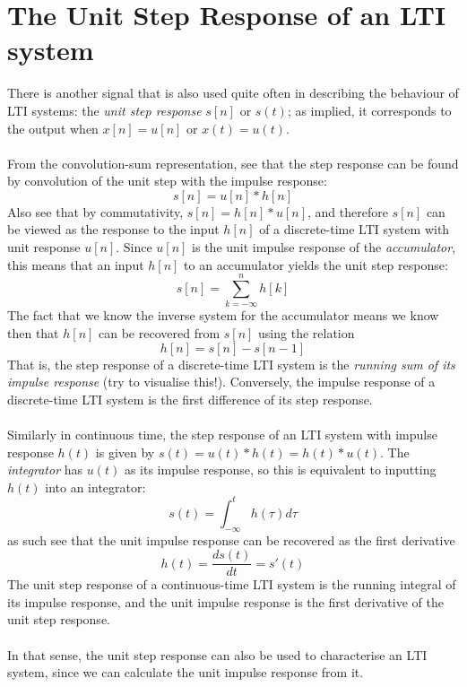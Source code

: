 \documentclass{report}
\begin{document}
\section{The Unit Step Response of an LTI system}
There is another signal that is also used quite often in describing the behaviour of LTI systems: the \textit{unit step response} $s[n]$
or $s(t)$; as implied, it corresponds to the output when $x[n]=u[n]$ or $x(t)=u(t)$.\\
\vspace{1mm}\\
 From the convolution-sum representation, see that
the step response can be found by convolution of the unit step with the impulse response:
\begin{equation*}
s[n]=u[n]*h[n]
\end{equation*}
Also see that by commutativity, $s[n]=h[n]*u[n]$, and therefore $s[n]$ can be viewed as the response to the input $h[n]$ of a 
discrete-time LTI system with unit response $u[n]$. Since $u[n]$ is the unit impulse response of the \textit{accumulator},
this means that an input $h[n]$ to an accumulator yields the unit step response:
\begin{equation*}
s[n]=\sum^n_{k=-\infty}h[k]
\end{equation*}
The fact that we know the inverse system for the accumulator means we know then that $h[n]$ can be recovered from $s[n]$ using the
relation
\begin{equation*}
h[n]=s[n]-s[n-1]
\end{equation*}
That is, the step response of a discrete-time LTI system is the \textit{running sum of its impulse response} (try to visualise this!). 
Conversely, the impulse response of a discrete-time LTI system is the first difference of its step response.\\
\vspace{1mm}\\
Similarly in continuous time, the step response of an LTI system with impulse response $h(t)$ is given by $s(t)=u(t)*h(t)=h(t)*u(t)$.
The \textit{integrator} has $u(t)$ as its impulse response, so this is equivalent to inputting $h(t)$ into an integrator:
\begin{equation*}
s(t)=\int^t_{-\infty}h(\tau)d\tau
\end{equation*}
as such see that the unit impulse response can be recovered as the first derivative
\begin{equation*}
h(t)=\frac{ds(t)}{dt}=s'(t)
\end{equation*}
The unit step response of a continuous-time LTI system is the running integral of its impulse response, and the unit impulse response is
the first derivative of the unit step response.\\
\vspace{1mm}\\
In that sense, the unit step response can also be used to characterise an LTI system, since we can calculate the unit impulse response
from it.
\newpage
\end{document}
